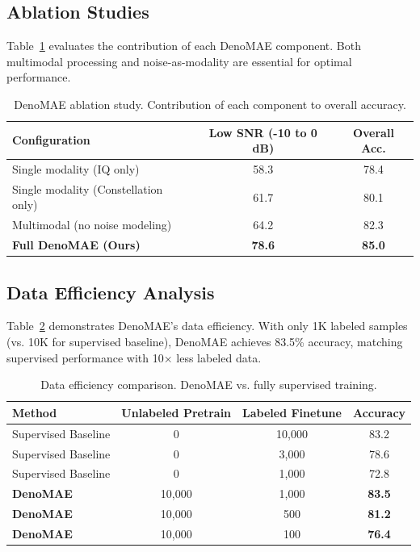 \subsection{Ablation Studies}
Table~\ref{tab:denomae_ablation} evaluates the contribution of each DenoMAE component. Both multimodal processing and noise-as-modality are essential for optimal performance.

\begin{table}[ht]
\centering
\caption{DenoMAE ablation study. Contribution of each component to overall accuracy.}
\label{tab:denomae_ablation}
\begin{tabular}{lcc}
\toprule
\textbf{Configuration} & \textbf{Low SNR (-10 to 0 dB)} & \textbf{Overall Acc.} \\
\midrule
Single modality (IQ only) & 58.3 & 78.4 \\
Single modality (Constellation only) & 61.7 & 80.1 \\
Multimodal (no noise modeling) & 64.2 & 82.3 \\
\textbf{Full DenoMAE (Ours)} & \textbf{78.6} & \textbf{85.0} \\
\bottomrule
\end{tabular}
\end{table}

\subsection{Data Efficiency Analysis}
Table~\ref{tab:denomae_data_efficiency} demonstrates DenoMAE's data efficiency. With only 1K labeled samples (vs. 10K for supervised baseline), DenoMAE achieves 83.5\% accuracy, matching supervised performance with 10× less labeled data.

\begin{table}[ht]
\centering
\caption{Data efficiency comparison. DenoMAE vs. fully supervised training.}
\label{tab:denomae_data_efficiency}
\begin{tabular}{lccc}
\toprule
\textbf{Method} & \textbf{Unlabeled Pretrain} & \textbf{Labeled Finetune} & \textbf{Accuracy} \\
\midrule
Supervised Baseline & 0 & 10,000 & 83.2 \\
Supervised Baseline & 0 & 3,000 & 78.6 \\
Supervised Baseline & 0 & 1,000 & 72.8 \\
\midrule
\textbf{DenoMAE} & 10,000 & 1,000 & \textbf{83.5} \\
\textbf{DenoMAE} & 10,000 & 500 & \textbf{81.2} \\
\textbf{DenoMAE} & 10,000 & 100 & \textbf{76.4} \\
\bottomrule
\end{tabular}
\end{table}

